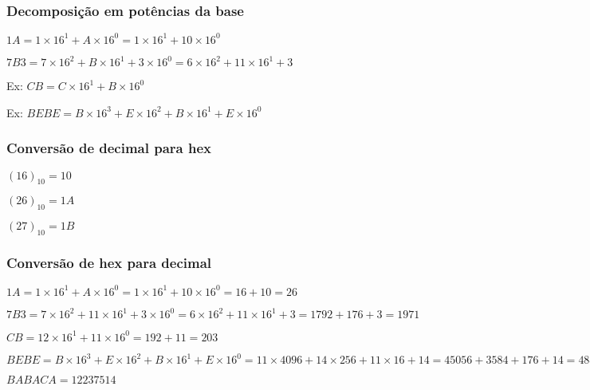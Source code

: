 \documentclass[a4paper]{article}
\begin{document}
\subsubsection*{Decomposição em potências da base}

$1A = 1\times 16^1 + A\times 16^0  = 1\times 16^1 + 10\times 16^0$

$7B3 = 7\times 16^2 + B\times 16^1 + 3\times 16^0  = 6\times 16^2 + 11\times 16^1 + 3$

Ex: $CB = C\times 16^1 + B\times 16^0$

Ex: $BEBE = B\times 16^3 + E\times 16^2 + B\times 16^1 + E\times 16^0$

\subsubsection*{Conversão de decimal para hex}

$(16)_{10} = 10$

$(26)_{10} = 1A$

$(27)_{10} = 1B$

\subsubsection*{Conversão de hex para decimal}

$1A = 1\times 16^1 + A\times 16^0  = 1\times 16^1 + 10\times 16^0  = 16 + 10 = 26$

$7B3 = 7\times 16^2 + 11\times 16^1 + 3\times 16^0  = 6\times 16^2 + 11\times 16^1 + 3 = 1792 + 176 + 3 =
1971$

$CB = 12\times 16^1 + 11\times 16^0  = 192 + 11 = 203$

$BEBE = B\times 16^3 + E\times 16^2 + B\times 16^1 + E\times 16^0  = 11\times 4096 + 14\times 256 + 11\times 16 + 14
 = 45056 + 3584 + 176 + 14 = 48830$
 
$BABACA = 12237514$
\end{document}

